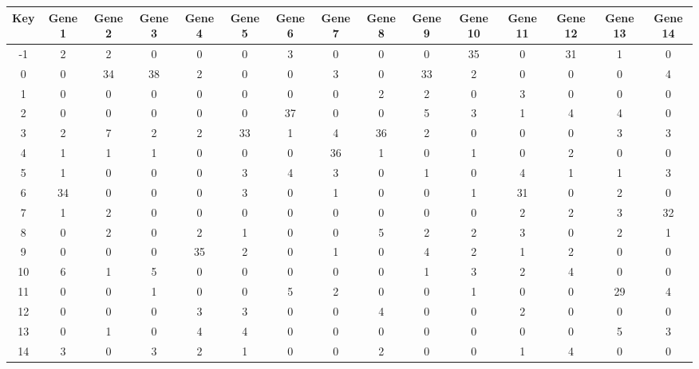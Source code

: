 \begin{tabular}{|c|c|c|c|c|c|c|c|c|c|c|c|c|c|c|}
\hline
Key & Gene 1 & Gene 2 & Gene 3 & Gene 4 & Gene 5 & Gene 6 & Gene 7 & Gene 8 & Gene 9 & Gene 10 & Gene 11 & Gene 12 & Gene 13 & Gene 14 \\
\hline
-1 & 2 & 2 & 0 & 0 & 0 & 3 & 0 & 0 & 0 & 35 & 0 & 31 & 1 & 0 \\
0 & 0 & 34 & 38 & 2 & 0 & 0 & 3 & 0 & 33 & 2 & 0 & 0 & 0 & 4 \\
1 & 0 & 0 & 0 & 0 & 0 & 0 & 0 & 2 & 2 & 0 & 3 & 0 & 0 & 0 \\
2 & 0 & 0 & 0 & 0 & 0 & 37 & 0 & 0 & 5 & 3 & 1 & 4 & 4 & 0 \\
3 & 2 & 7 & 2 & 2 & 33 & 1 & 4 & 36 & 2 & 0 & 0 & 0 & 3 & 3 \\
4 & 1 & 1 & 1 & 0 & 0 & 0 & 36 & 1 & 0 & 1 & 0 & 2 & 0 & 0 \\
5 & 1 & 0 & 0 & 0 & 3 & 4 & 3 & 0 & 1 & 0 & 4 & 1 & 1 & 3 \\
6 & 34 & 0 & 0 & 0 & 3 & 0 & 1 & 0 & 0 & 1 & 31 & 0 & 2 & 0 \\
7 & 1 & 2 & 0 & 0 & 0 & 0 & 0 & 0 & 0 & 0 & 2 & 2 & 3 & 32 \\
8 & 0 & 2 & 0 & 2 & 1 & 0 & 0 & 5 & 2 & 2 & 3 & 0 & 2 & 1 \\
9 & 0 & 0 & 0 & 35 & 2 & 0 & 1 & 0 & 4 & 2 & 1 & 2 & 0 & 0 \\
10 & 6 & 1 & 5 & 0 & 0 & 0 & 0 & 0 & 1 & 3 & 2 & 4 & 0 & 0 \\
11 & 0 & 0 & 1 & 0 & 0 & 5 & 2 & 0 & 0 & 1 & 0 & 0 & 29 & 4 \\
12 & 0 & 0 & 0 & 3 & 3 & 0 & 0 & 4 & 0 & 0 & 2 & 0 & 0 & 0 \\
13 & 0 & 1 & 0 & 4 & 4 & 0 & 0 & 0 & 0 & 0 & 0 & 0 & 5 & 3 \\
14 & 3 & 0 & 3 & 2 & 1 & 0 & 0 & 2 & 0 & 0 & 1 & 4 & 0 & 0 \\
\hline
\end{tabular}